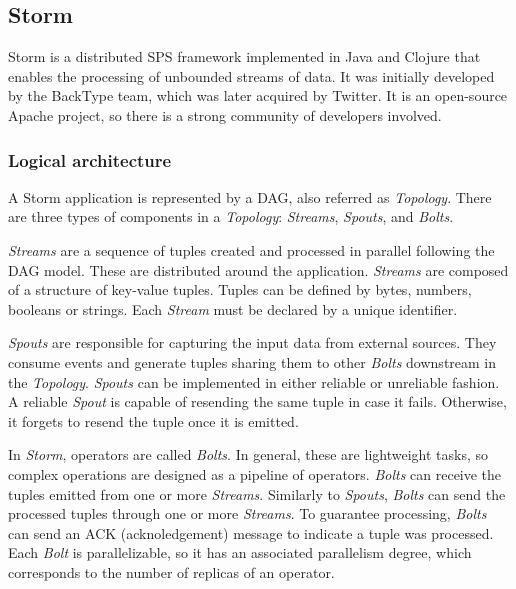 \subsection{Storm}

Storm \citep{toshniwal2014storm} is a distributed SPS framework implemented in Java and Clojure that enables the processing of unbounded streams of data. It was initially developed by the BackType team, which was later acquired by Twitter. It is an open-source Apache project, so there is a strong community of developers involved.

\subsubsection{Logical architecture}

A Storm application is represented by a DAG, also referred as \textit{Topology}. There are three types of components in a \textit{Topology}: \textit{Streams}, \textit{Spouts}, and \textit{Bolts}. 

\textit{Streams} are a sequence of tuples created and processed in parallel following the DAG model. These are distributed around the application. \textit{Streams} are composed of a structure of key-value tuples. Tuples can be defined by bytes, numbers, booleans or strings. Each \textit{Stream} must be declared by a unique identifier.

\textit{Spouts} are responsible for capturing the input data from external sources. They consume events and generate tuples sharing them to other \textit{Bolts} downstream in the \textit{Topology}. \textit{Spouts} can be implemented in either reliable or unreliable fashion. A reliable \textit{Spout} is capable of resending the same tuple in case it fails. Otherwise, it forgets to resend the tuple once it is emitted.

In \textit{Storm}, operators are called \textit{Bolts}. In general, these are lightweight tasks, so complex operations are designed as a pipeline of operators. \textit{Bolts} can receive the tuples emitted from one or more \textit{Streams}. Similarly to \textit{Spouts}, \textit{Bolts} can send the processed tuples through one or more \textit{Streams}. To guarantee processing, \textit{Bolts} can send an ACK (acknoledgement) message to indicate a tuple was processed. Each \textit{Bolt} is parallelizable, so it has an associated parallelism degree, which corresponds to the number of replicas of an operator.


